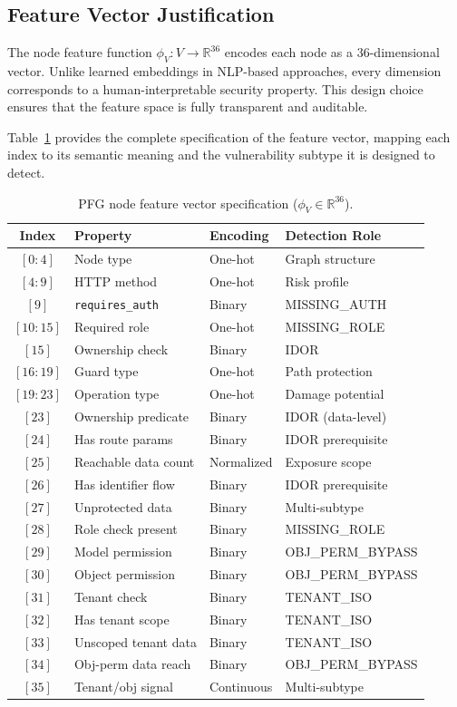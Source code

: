 \subsection{Feature Vector Justification}

The node feature function $\phi_V: V \to \mathbb{R}^{36}$ encodes each node as a 36-dimensional vector. Unlike learned embeddings in NLP-based approaches, every dimension corresponds to a human-interpretable security property. This design choice ensures that the feature space is fully transparent and auditable.

Table~\ref{tab:feature-vector} provides the complete specification of the feature vector, mapping each index to its semantic meaning and the vulnerability subtype it is designed to detect.

\begin{table}[htbp]
\centering
\caption{PFG node feature vector specification ($\phi_V \in \mathbb{R}^{36}$).}
\label{tab:feature-vector}
\small
\begin{tabular}{@{}clll@{}}
\toprule
\textbf{Index} & \textbf{Property} & \textbf{Encoding} & \textbf{Detection Role} \\
\midrule
$[0{:}4]$ & Node type & One-hot & Graph structure \\
$[4{:}9]$ & HTTP method & One-hot & Risk profile \\
$[9]$ & \texttt{requires\_auth} & Binary & MISSING\_AUTH \\
$[10{:}15]$ & Required role & One-hot & MISSING\_ROLE \\
$[15]$ & Ownership check & Binary & IDOR \\
$[16{:}19]$ & Guard type & One-hot & Path protection \\
$[19{:}23]$ & Operation type & One-hot & Damage potential \\
$[23]$ & Ownership predicate & Binary & IDOR (data-level) \\
$[24]$ & Has route params & Binary & IDOR prerequisite \\
$[25]$ & Reachable data count & Normalized & Exposure scope \\
$[26]$ & Has identifier flow & Binary & IDOR prerequisite \\
$[27]$ & Unprotected data & Binary & Multi-subtype \\
$[28]$ & Role check present & Binary & MISSING\_ROLE \\
$[29]$ & Model permission & Binary & OBJ\_PERM\_BYPASS \\
$[30]$ & Object permission & Binary & OBJ\_PERM\_BYPASS \\
$[31]$ & Tenant check & Binary & TENANT\_ISO \\
$[32]$ & Has tenant scope & Binary & TENANT\_ISO \\
$[33]$ & Unscoped tenant data & Binary & TENANT\_ISO \\
$[34]$ & Obj-perm data reach & Binary & OBJ\_PERM\_BYPASS \\
$[35]$ & Tenant/obj signal & Continuous & Multi-subtype \\
\bottomrule
\end{tabular}
\end{table}

